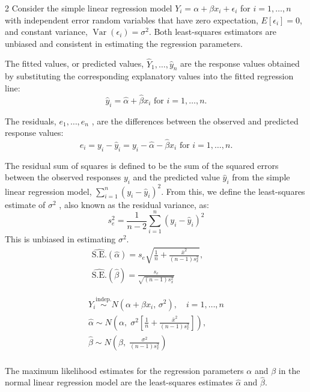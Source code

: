 \documentclass[10pt]{extarticle}
\theoremstyle{definition}
\theoremstyle{remark}
\DeclareMathOperator{\Var}{Var}
\begin{document}
\begin{multicols}{2}
    Consider the simple linear regression model $Y_i = \alpha + \beta x_i + \epsilon_i$ for 
    $i = 1, \ldots , n$ with independent error random variables that have zero expectation,
    $E [\epsilon_i ] = 0$, and constant variance, $\Var (\epsilon_i ) =
    \sigma^2 $. Both least-squares estimators are unbiased and consistent in
    estimating the regression parameters.

    The fitted values, or predicted values, $\hat{Y}_1 , \ldots , \hat{y}_n$
    are the response
    values obtained by substituting the corresponding explanatory values into
    the fitted regression line: 
    \[ \hat{y}_i = \hat{\alpha} + \hat{\beta}x_i \text{ for } i = 1, \ldots, n. \]

    The residuals, $e_1 , \ldots , e_n$ , are the differences between the observed
    and predicted response values:
    \[ e_i = y_i - \hat{y}_i = y_i - \hat{\alpha} - \hat{\beta}x_i \text{ for } i = 1, \ldots, n.\]

    The residual sum of squares is defined to be the sum of the squared errors
    between the observed responses $y_i$ and the predicted value $\hat{y}_i$ from the
    simple linear regression model, $\sum_{i=1}^n (y_i - \hat{y}_i )^2$. From
    this, we define
    the least-squares estimate of $\sigma^2$ , also known as the residual variance, as:
    \[ s_e^2 = \frac{1}{n-2} \sum_{i=1}^n (y_i - \hat{y}_i)^2 \]
    This is unbiased in estimating $\sigma^2$. 
    \begin{gather*}
        \widehat{\text{S.E.}}(\hat{\alpha}) = s_e\sqrt{\frac{1}{n} + \frac{\bar{x}^2}{(n-1)s_x^2}}, \qquad \\
        \widehat{\text{S.E.}}(\hat{\beta}) = \frac{s_e}{\sqrt{(n-1)s_x^2}}
    \end{gather*}

    \begin{gather*}
        Y_i \overset{\text{indep.}}{\sim} N(\alpha + \beta x_i,\, \sigma^2), \quad i = 1, \ldots, n \\
        \hat{\alpha} \sim N\!\left(\alpha,\; \sigma^2\!\left[\frac{1}{n} + \frac{\bar{x}^2}{(n-1)s_x^2}\right]\right), \qquad \\
        \hat{\beta} \sim N\!\left(\beta,\; \frac{\sigma^2}{(n-1)s_x^2}\right) \\
    \end{gather*}

    The maximum likelihood estimates for the regression parameters $\alpha$ and $\beta$ in
    the normal linear regression model are the least-squares estimates $\hat{\alpha}$ and
    $\hat{\beta}.$ 


\end{multicols}
\end{document}
